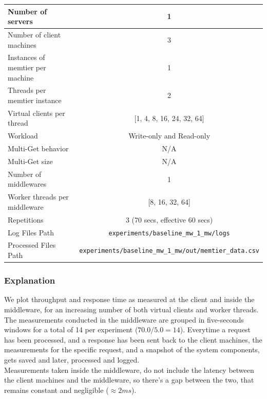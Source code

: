 \documentclass[11pt,a4paper]{article}
\begin{document}
\begin{center}
	\scriptsize{
		\begin{tabular}{|l|c|}
			\hline Number of servers                & 1                        \\ 
			\hline Number of client machines        & 3                        \\ 
			\hline Instances of memtier per machine & 1                        \\ 
			\hline Threads per memtier instance     & 2                        \\
            \hline Virtual clients per thread       & [1, 4, 8, 16, 24, 32, 64]\\ 
			\hline Workload                         & Write-only and Read-only \\
			\hline Multi-Get behavior               & N/A                      \\
			\hline Multi-Get size                   & N/A                      \\
			\hline Number of middlewares            & 1                        \\
			\hline Worker threads per middleware    & [8, 16, 32, 64]                  \\
            \hline Repetitions                      & 3 (70 secs, effective 60 secs) \\ 
            \hline Log Files Path                   & \texttt{experiments/baseline\_mw\_1\_mw/logs} \\
            \hline Processed Files Path             & \texttt{experiments/baseline\_mw\_1\_mw/out/memtier\_data.csv}\\
            \hline
		\end{tabular}
	} 
\end{center}

\subsubsection{Explanation}

We plot throughput and response time as measured at the client and inside the middleware, for an increasing number of both virtual clients and  worker threads.\\
The measurements conducted in the middleware are grouped in five-seconds windows for a total of 14 per experiment ($ 70.0 / 5.0 = 14$). Everytime a request has been processed, and a response has been sent back to the client machines, the measurements for the specific request, and a snapshot of the system components, gets saved and later, processed and logged.\\
Measurements taken inside the middleware, do not include the latency between the client machines and the middleware, so there's a gap between the two, that remains constant and negligible ($\approx 2 ms$).
\end{document}
